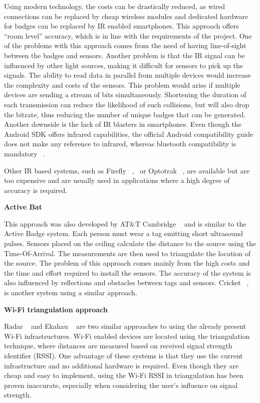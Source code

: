 Using modern technology, the costs can be drastically reduced, as wired connections can be replaced by cheap wireless modules and dedicated hardware for badges can be replaced by IR enabled smartphones. This approach offers “room level” accuracy, which is in line with the requirements of the project. One of the problems with this approach comes from the need of having line-of-sight between the badges and sensors. Another problem is that the IR signal can be influenced by other light sources, making it difficult for sensors to pick up the signals. The ability to read data in parallel from multiple devices would increase the complexity and costs of the sensors. This problem would arise if multiple devices are sending a stream of bits simultaneously. Shortening the duration of each transmission can reduce the likelihood of such collisions, but will also drop the bitrate, thus reducing the number of unique badges that can be generated. Another downside is the lack of IR blasters in smartphones. Even though the Android SDK offers infrared capabilities, the official Android compatibility guide does not make any reference to infrared, whereas bluetooth compatibility is mandatory ~\cite{AndroidCompat}.

Other IR based systems, such as Firefly ~\cite{Firefly1},~\cite{Firefly2} or Optotrak ~\cite{Optotrak}, are available but are too expensive and are usually used in applications where a high degree of accuracy is required. 

\medskip
\noindent \textbf{Active Bat}

This approach was also developed by AT\&T Cambridge ~\cite{ActiveBat} and is similar to the Active Badge system. Each person must wear a tag emitting short ultrasound pulses. Sensors placed on the ceiling calculate the distance to the source using the Time-Of-Arrival. The measurements are then used to triangulate the location of the source. The problem of this approach comes mainly from the high costs and the time and effort required to install the sensors. The accuracy of the system is also influenced by reflections and obstacles between tags and sensors. Cricket ~\cite{Priyantha1}, ~\cite{Priyantha2} is another system using a similar approach.

\medskip
\noindent \textbf{Wi-Fi triangulation approach}

Radar ~\cite{Bahl} and Ekahau ~\cite{Ekahau} are two similar approaches to using the already present Wi-Fi infrastructures. Wi-Fi enabled devices are located using the triangulation technique, where distances are measured based on received signal strength identifier (RSSI). One advantage of these systems is that they use the current infrastructure and no additional hardware is required. Even though they are cheap and easy to implement, using the Wi-Fi RSSI in triangulation has been proven inaccurate, especially when considering the user’s influence on signal strength. 

